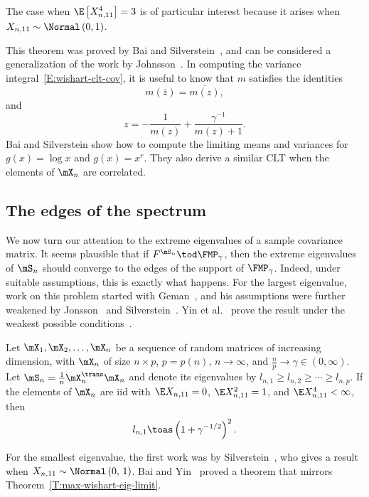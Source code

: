 \noindent
The case when $\E\left[ X_{n,11}^4 \right] = 3$ is of particular interest
because it arises when $X_{n,11} \sim \Normal\left( 0, 1 \right)$.

This theorem was proved by Bai and Silverstein~\cite{bai2004clt}, and can
be considered a generalization of the work by Johnsson~\cite{jonsson1982slt}.
In computing the variance integral~\eqref{E:wishart-clt-cov}, it is useful to know that $m$ satisfies
the identities 
\[
    m(\bar z) = \overline{m (z) },
\]
and
\[
    z = - \frac{1}{m(z)} + \frac{\gamma^{-1}}{m(z) + 1}.
\]
Bai and Silverstein show how to compute the limiting means and variances
for $g(x) = \log x$ and $g(x) = x^r$.  They also derive a similar CLT when
the elements of $\mX_n$ are correlated.


\subsection{The edges of the spectrum}

We now turn our attention to the extreme eigenvalues of a sample covariance
matrix.  It seems plausible that if $F^{\mS_n} \tod \FMP_\gamma$, then the
extreme eigenvalues of $\mS_n$ should converge to the edges of the support
of $\FMP_\gamma$.  Indeed, under suitable assumptions, this is exactly what
happens.  For the largest eigenvalue, work on this problem started with Geman~\cite{geman1980ltn}, and his assumptions were further weakened by Jonsson~\cite{jonsson1983ole} and Silverstein~\cite{silverstein1984ole}.
Yin et al.~\cite{yin1988lle} prove the result under the weakest possible
conditions~\cite{bai1988nle}.

\begin{theorem}\label{T:max-wishart-eig-limit}
    Let $\mX_1, \mX_2, \ldots, \mX_n$ be a sequence of random matrices of
    increasing dimension, with $\mX_n$ of size $n \times p$, $p = p(n)$, 
    $n \to \infty$, and
    $\frac{n}{p} \to \gamma \in (0,\infty)$.  Let $\mS_n = \frac{1}{n} \mX_n^\trans \mX_n$ and 
    denote its eigenvalues by 
    $l_{n,1} \geq l_{n,2} \geq \cdots \geq l_{n,p}$.  If the 
    elements of $\mX_n$ are 
    iid with $\E X_{n,11} = 0$, $\E X_{n,11}^2 = 1$, and
    $\E X_{n,11}^4 < \infty$, then
    \[
        l_{n,1} \toas \left( 1 + \gamma^{-1/2} \right)^2.
    \]
\end{theorem}

For the smallest eigenvalue, the first work was by Silverstein~\cite{silverstein1985sel}, who gives a result when 
$X_{n,11} \sim \Normal\left( 0,\, 1 \right)$.  Bai and Yin~\cite{bai1993lse} proved a theorem that mirrors Theorem~\ref{T:max-wishart-eig-limit}.

